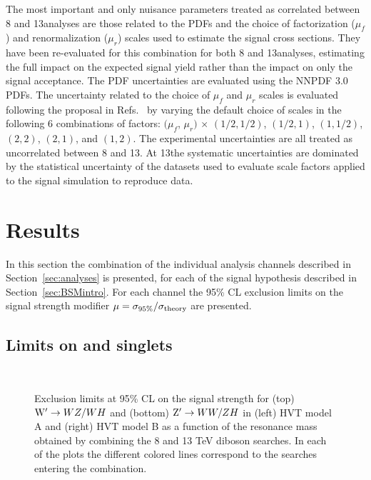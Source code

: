 The most important and only nuisance parameters treated as correlated between 8 and 13\TeV analyses are those related to the PDFs and the choice of factorization ($\mu_{f}$) and renormalization ($\mu_{r}$) scales used to estimate the signal cross sections.
They have been re-evaluated for this combination for both 8 and 13\TeV analyses, estimating the full impact on the expected signal yield rather than the impact on only the signal acceptance.
The PDF uncertainties are evaluated using the NNPDF 3.0~\cite{Ball:2011mu} PDFs.
The uncertainty related to the choice of $\mu_{f}$ and $\mu_{r}$ scales is evaluated following the proposal in Refs.~\cite{Cacciari:2003fi,Catani:2003zt} by varying the default choice of scales in the following 6 combinations of factors:
$(\mu_{f}$, $\mu_{r})$ $\times$ $(1/2, 1/2)$, $(1/2, 1)$, $(1,1/2)$, $(2, 2)$, $(2, 1)$, and $(1, 2)$.
The experimental uncertainties are all treated as uncorrelated between 8 and 13\TeV. At 13\TeV the systematic uncertainties are dominated by the statistical uncertainty of the datasets used to evaluate scale factors applied to the signal simulation to reproduce data.

\section{Results}\label{sec:comboResults}

In this section the combination of the individual analysis channels described in Section~\ref{sec:analyses} is presented, for each of the signal hypothesis described in Section~\ref{sec:BSMintro}.
For each channel the 95\% CL exclusion limits on the signal strength modifier $\mu = \sigma_{95\%}/\sigma_{\rm theory}$ are presented.

\subsection{Limits on \Wpr and \Zpr singlets}

\begin{figure}[!htb]
\centering
{}
\\
\caption{%
Exclusion limits at 95\% CL on the signal strength for (top) $\mathrm{W}^\prime \rightarrow WZ/WH$ and (bottom) $\mathrm{Z}^\prime \rightarrow WW/ZH$ in (left) HVT model A and (right) HVT model B as a function of the resonance mass obtained by combining the 8 and 13 TeV diboson searches. In each of the plots the different colored lines correspond to the searches entering the combination.}
\label{fig:wpall_138TeV}
\end{figure}

